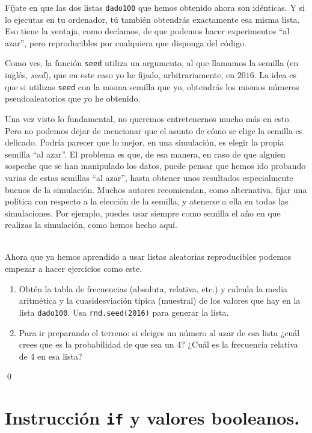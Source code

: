 \documentclass[10pt,a4paper]{article}\usepackage[]{graphicx}\usepackage[]{color}
\begin{document}
Fíjate en que las dos listas {\tt dado100} que hemos obtenido ahora son idénticas. Y si lo ejecutas en tu ordenador, tú también obtendrás exactamente esa misma lista. Eso tiene la ventaja, como decíamos, de que podemos hacer experimentos ``al azar'', pero reproducibles por cualquiera que disponga del código.

Como ves, la función {\tt seed} utiliza un argumento, al que llamamos la {\sf semilla} (en inglés, {\em seed}), que en este caso yo he fijado, arbitrariamente, en $2016$.  La idea es que si utilizas {\tt seed} con la misma semilla que yo, obtendrás los mismos números pseudoaleatorios que yo he obtenido.

Una vez visto lo fundamental, no queremos entretenernos mucho más en esto. Pero no podemos dejar de mencionar que el asunto de cómo se elige la semilla es delicado. Podría parecer que lo mejor, en una simulación, es elegir la propia semilla ``al azar''. El problema es que, de esa manera, en caso de que alguien sospeche que se han manipulado los datos, puede pensar que hemos ido probando varias de estas semillas ``al azar'', hasta obtener unos resultados especialmente buenos de la simulación. Muchos autores recomiendan, como alternativa, fijar una política con respecto a la elección de la semilla, y atenerse a ella en todas las simulaciones. Por ejemplo, puedes usar siempre como semilla el año en que realizas la simulación, como hemos hecho aquí.

\begin{ejercicio}
\label{tut02:ejercicio28}
\quad\\
Ahora que ya hemos aprendido a usar listas aleatorias reproducibles podemos empezar a hacer ejercicios como este.
\begin{enumerate}
\item Obtén la tabla de frecuencias  (absoluta, relativa, etc.) y calcula la media aritmética y la cuasidesviación típica (muestral) de los valores que hay en la lista {\tt dado100}. Usa {\tt rnd.seed(2016)} para generar la lista.
\item Para ir preparando el terreno: si eleiges un número al azar de esa lista ¿cuál crees que es la probabilidad de que sea un 4? ¿Cuál es la frecuencia relativa de 4 en esa lista?
\end{enumerate}
\qed
\end{ejercicio}

\section{Instrucción {\tt if} y valores booleanos.}
\label{tut02:sec:instruccionIfValoresBooleanos}
\end{document}
